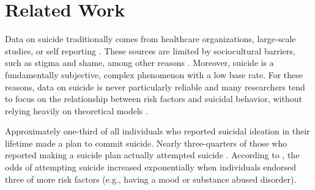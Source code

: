 \documentclass[11pt]{article}
\begin{document}

\section{Related Work}
Data on suicide traditionally comes from healthcare organizations, large-scale studies, or self reporting \cite{crosby2011self,horowitz2009suicide}. These sources are limited by sociocultural barriers, such as stigma and shame, among other reasons \cite{crosby2011self}. Moreover, suicide is a fundamentally subjective, complex phenomenon with a low base rate. For these reasons, data on suicide is never particularly reliable and many researchers tend to focus on the relationship between risk factors and suicidal behavior, without relying heavily on theoretical models \cite{nock2008suicide}.

Approximately one-third of all individuals who reported suicidal ideation in their lifetime made a plan to commit suicide. Nearly three-quarters of those who reported making a suicide plan actually attempted suicide \cite{kessler1999prevalence}. According to , the odds of attempting suicide increased exponentially when individuals endorsed three of more risk factors (e.g., having a mood or substance abused disorder). 
\end{document}
